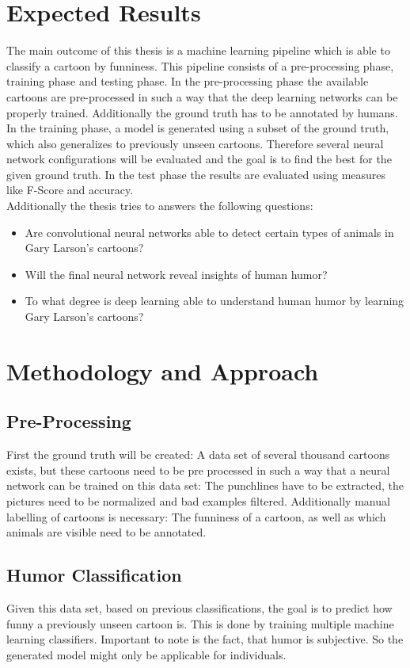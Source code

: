 \documentclass[11pt]{article}
\begin{document}
\section{Expected Results}
The main outcome of this thesis is a machine learning pipeline which is able to classify a cartoon by funniness. This pipeline consists of a pre-processing phase, training phase and testing phase. In the pre-processing phase the available cartoons are pre-processed in such a way that the deep learning networks can be properly trained. Additionally the ground truth has to be annotated by humans. In the training phase, a model is generated using a subset of the ground truth, which also generalizes to previously unseen cartoons. Therefore several neural network configurations will be evaluated and the goal is to find the best for the given ground truth. In the test phase the results are evaluated using measures like F-Score and accuracy. \\

Additionally the thesis tries to answers the following questions:
\begin{itemize}
\item Are convolutional neural networks able to detect certain types of animals in Gary Larson's cartoons?
\item Will the final neural network reveal insights of human humor?
\item To what degree is deep learning able to understand human humor by learning Gary Larson's cartoons?
\end{itemize}

\pagebreak
\section{Methodology and Approach}
\subsection {Pre-Processing}
First the ground truth will be created: A data set of several thousand cartoons exists, but these cartoons need to be pre processed in such a way that a neural network can be trained on this data set: The punchlines have to be extracted, the pictures need to be normalized and bad examples filtered. Additionally manual labelling of cartoons is necessary: The funniness of a cartoon, as well as which animals are visible need to be annotated. \\

\subsection {Humor Classification}
Given this data set, based on previous classifications, the goal is to predict how funny a previously unseen cartoon is. This is done by training multiple machine learning classifiers. Important to note is the fact, that humor is subjective. So the generated model might only be applicable for individuals. \\
\end{document}
